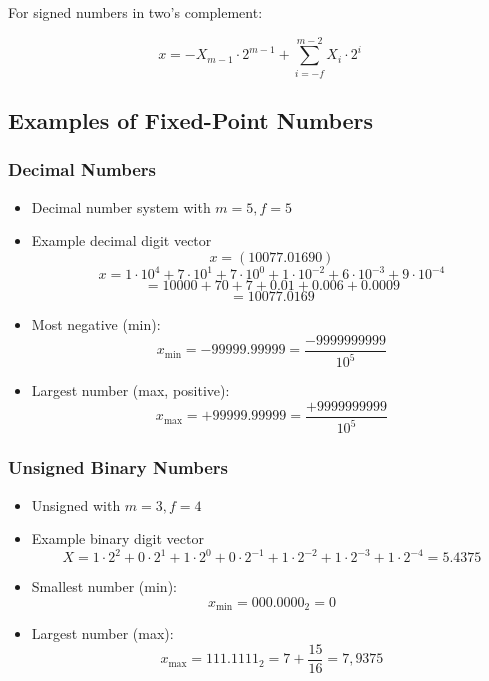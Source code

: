 \documentclass[12pt,openany, tikz,border=10pt]{book}
\begin{document}
		\vskip 0.5cm
		For signed numbers in two's complement:
		
		\[ x = -X_{m-1} \cdot 2^{m-1} + \sum_{i=-f}^{m-2} X_i \cdot 2^i \]
		
		\newpage
		\subsection{Examples of Fixed-Point Numbers}
		\subsubsection{ Decimal Numbers}
		
		\begin{itemize}
			\item[] Decimal number system with \( m = 5, f = 5 \)
			\item[] Example decimal digit vector
			      \[
			      	x = (10077.01690)
			      \]
			      \[
			      	x = 1 \cdot 10^4 + 7 \cdot 10^1 + 7 \cdot 10^0 + 1 \cdot 10^{-2} + 6 \cdot 10^{-3} + 9 \cdot 10^{-4}
			      \]
			      \[
			      	= 10000 + 70 + 7 + 0.01 + 0.006 + 0.0009
			      \]
			      \[
			      	= 10077.0169
			      \]
			\item[] Most negative (min):
			      \[
			      	x_{\text{min}} = -99999.99999 = \frac{-9999999999}{10^5}
			      \]
			\item[] Largest number (max, positive):
			      \[
			      	x_{\text{max}} = +99999.99999 = \frac{+9999999999}{10^5}
			      \]
		\end{itemize}
		
		\subsubsection{Unsigned Binary Numbers}
		
		\begin{itemize}
			\item[] Unsigned with \( m = 3, f = 4 \)
			\item[] Example binary digit vector
			      \[
			      	X = 1 \cdot 2^2 + 0 \cdot 2^1 + 1 \cdot 2^0 + 0 \cdot 2^{-1} + 1 \cdot 2^{-2} + 1 \cdot 2^{-3} + 1 \cdot 2^{-4} = 5.4375 \]
			      	
			      	\item[] Smallest number (min):
			      	\[
			      		x_{\text{min}} = 000.0000_2 = 0
			      	\]
			      	\item[] Largest number (max):
			      	\[
			      		x_{\text{max}} = 111.1111_2 = 7 + \frac{15}{16} = 7,9375
			      	\]
			      	\end{itemize}
			      	    
\end{document}
